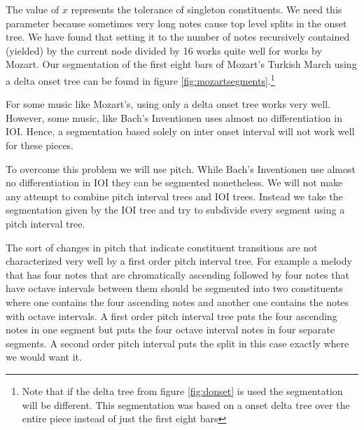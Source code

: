 \documentclass[a4paper,10pt]{article}
\begin{document}
The value of $x$ represents the tolerance of singleton constituents. We need this parameter because sometimes very long notes cause top level splits in the onset tree. We have found that setting it to the number of notes recursively contained (yielded) by the current node divided by 16 works quite well for works by Mozart. Our segmentation of the first eight bars of Mozart's Turkish March using a delta onset tree can be found in figure \ref{fig:mozartsegments}.\footnote{Note that if the delta tree from figure  \ref{fig:donset} is used the segmentation will be different. This segmentation was based on a onset delta tree over the entire piece instead of just the first eight bars}




For some music like Mozart's, using only a delta onset tree works very well. However, some music, like Bach's Inventionen uses almost no differentiation in IOI. Hence, a segmentation based solely on inter onset interval will not work well for these pieces.

To overcome this problem we will use pitch. While Bach's Inventionen use almost no differentiation in IOI they can be segmented nonetheless. We will not make any attempt to combine pitch interval trees and IOI trees. Instead we take the segmentation given by the IOI tree and try to subdivide every segment using a pitch interval tree. 

The sort of changes in pitch that indicate constituent transitions are not characterized very well by a first order pitch interval tree. For example a melody that has four notes that are chromatically ascending followed by four notes that have octave intervals between them should be segmented into two constituents where one contains the four ascending notes and another one contains the notes with octave intervals. A first order pitch interval tree puts the four ascending notes in one segment but puts the four octave interval notes in four separate segments. A second order pitch interval puts the split in this case exactly where we would want it.
\end{document}

